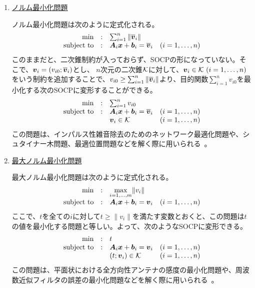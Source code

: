 \documentclass[11pt,a4paper,dvipdfmx,titlepage,uplatex]{jsarticle}
\theoremstyle{mystyle}
\newcommand{\0}{\mathbf{0}}
\def\b{\mbox{\boldmath $b$}}
\def\v{\mbox{\boldmath $v$}}
\def\x{\mbox{\boldmath $x$}}
\def\A{\mbox{\boldmath $A$}}
\def\KC{\mbox{$\cal K$}}
\begin{document}
\begin{enumerate}[具体例1) :] \upshape
	\item \underline{ノルム最小化問題}

  ノルム最小化問題は次のように定式化される。
  \begin{align}
    \begin{array}{rclc}
      \min & : & \sum_{i=1}^{n} \|\overline{\v}_i\| & \\
      \text{subject to} & : &  \A_i \x + \b_i = \overline{\v}_i & (i = 1, \dots , n)\\
    \end{array}
  \end{align}
  このままだと、二次錐制約が入っておらず、SOCPの形になっていない。そこで、$\v_i = (v_{i0} ; \overline{\v}_i)$とし、
  $n$次元の二次錐$\KC$に対して、$\v_i \in \KC \ (i = 1, \dots , n)$をいう制約を追加することで、$v_{i0} \ge \sum_{i=1}^{n} \|\overline{\v}_i\|$より、目的関数$\sum_{i=1}^{n} v_{i0}$を最小化する次のSOCPに変形することができる。
  \begin{align}
    \begin{array}{rclc}
      \min & : & \sum_{i=1}^{n} v_{i0} & \\
      \text{subject to} & : & \A_i \x + \b_i = \overline{\v}_i & (i = 1, \dots , n)\\
      & & \v_i \in \KC & (i = 1, \dots , n)
    \end{array}
  \end{align}
  この問題は、インパルス性雑音除去のためのネットワーク最適化問題や、シュタイナー木問題、最適位置問題などを解く際に用いられる~\cite{lobo1998applications}。
  \item \underline{最大ノルム最小化問題}

  最大ノルム最小化問題は次のように定式化される。
  \begin{align}
    \begin{array}{rclc}
      \min & : & \underset{i = 1, \dots , m}{\max} \|v_i\|  & \\
      \text{subject to} & : & \A_i \x + \b_i = \v_i & (i = 1, \dots , n)
    \end{array}
  \end{align}
  ここで、$t$を全ての$i$に対して$t \ge \|v_i\|$を満たす変数とおくと、この問題は$t$の値を最小化する問題と等しい。よって、次のようなSOCPに変形できる。
  \begin{align}
    \begin{array}{rclc}
      \min & : & t & \\
      \text{subject to} & : & \A_i \x + \b_i = \v_i & (i = 1, \dots , n)\\
      & & (t;\v_i) \in \KC  &  (i = 1, \dots , n)
    \end{array}
  \end{align}
  この問題は、平面状における全方向性アンテナの感度の最小化問題や、周波数近似フィルタの誤差の最小化問題などを解く際に用いられる~\cite{lobo1998applications}。
\end{enumerate}
\end{document}
